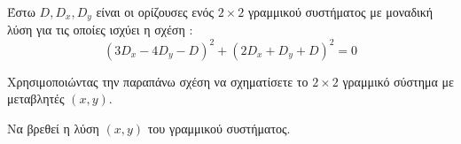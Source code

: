 Έστω $ D,D_x,D_y $ είναι οι ορίζουσες ενός $ 2\times2 $ γραμμικού συστήματος με μοναδική λύση για τις οποίες ισχύει η σχέση :
\[ \left( 3D_x-4D_y-D\right) ^2+\left( 2D_x+D_y+D\right) ^2=0\]
\begin{erwthma}
\item Χρησιμοποιώντας την παραπάνω σχέση να σχηματίσετε το $ 2\times2 $ γραμμικό σύστημα με μεταβλητές $ (x,y) $.
\item Να βρεθεί η λύση $ (x,y) $ του γραμμικού συστήματος.
\end{erwthma}